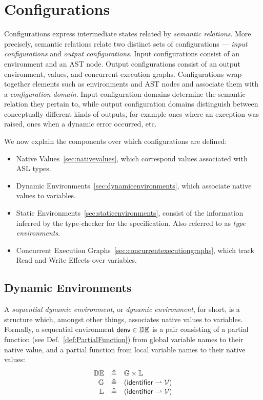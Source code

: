 \documentclass{book}
\newcommand\defref[1]{Def.~\ref{def:#1}}
\newcommand\denv[0]{\textsf{denv}}
\newcommand\vals[0]{\mathcal{V}}
\begin{document}
\section{Configurations \label{sec:configurations}}

Configurations express intermediate states related by \emph{semantic relations}.
%
More precisely, semantic relations relate two distinct sets of configurations ---
\emph{input configurations} and \emph{output configurations}.
Input configurations consist of an environment and an AST node.
Output configurations consist of an output environment, values,
and concurrent execution graphs.
%
Configurations wrap together elements such as environments and AST nodes
and associate them with a \emph{configuration domain}. Input configuration domains
determine the semantic relation they pertain to, while output configuration
domains distinguish between conceptually different kinds of outputs, for example
ones where an exception was raised, ones when a dynamic error occurred, etc.

We now explain the components over which configurations are defined:
\begin{itemize}
  \item Native Values~\ref{sec:nativevalues}, which correspond values associated with ASL types.
  \item Dynamic Environments~\ref{sec:dynamicenvironments}, which associate native values to variables.
  \item Static Environments~\ref{sec:staticenvironments}, consist of the information inferred
  by the type-checker for the specification. Also referred to as \emph{type environments}.
  \item Concurrent Execution Graphs~\ref{sec:concurrentexecutiongraphs}, which track Read and Write Effects over variables.
\end{itemize}

\subsection{Dynamic Environments \label{sec:dynamicenvironments}}

A \emph{sequential dynamic environment}, or \emph{dynamic environment}, for short, is a structure which,
amongst other things, associates native values to variables.
Formally, a sequential environment $\denv \in \dynamicenvs$ is a pair consisting of a partial function
(see \defref{PartialFunction}) from global
variable names to their native value, and a partial function from local variable names to their
native values:
\[
\begin{array}{rcl}
  \dynamicenvs          &\triangleq&  \mathbb{G} \times \mathbb{L} \\
  \mathbb{G}            &\triangleq&  (\identifier \partialto \vals) \\
  \mathbb{L}            &\triangleq&  (\identifier \partialto \vals) \\
\end{array}
\]
\end{document}
